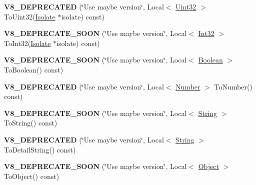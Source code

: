 \begin{DoxyCompactItemize}
\item 
{\bfseries V8\+\_\+\+D\+E\+P\+R\+E\+C\+A\+T\+ED} (\char`\"{}Use maybe version\char`\"{}, Local$<$ \hyperlink{classv8_1_1_uint32}{Uint32} $>$ To\+Uint32(\hyperlink{classv8_1_1_isolate}{Isolate} $\ast$isolate) const)\hypertarget{classv8_1_1_value_a1582d050951071123139095fa6696e6b}{}\label{classv8_1_1_value_a1582d050951071123139095fa6696e6b}

\item 
{\bfseries V8\+\_\+\+D\+E\+P\+R\+E\+C\+A\+T\+E\+\_\+\+S\+O\+ON} (\char`\"{}Use maybe version\char`\"{}, Local$<$ \hyperlink{classv8_1_1_int32}{Int32} $>$ To\+Int32(\hyperlink{classv8_1_1_isolate}{Isolate} $\ast$isolate) const)\hypertarget{classv8_1_1_value_abf72660ee84f81fe2fed85e39e6a3c86}{}\label{classv8_1_1_value_abf72660ee84f81fe2fed85e39e6a3c86}

\item 
{\bfseries V8\+\_\+\+D\+E\+P\+R\+E\+C\+A\+T\+E\+\_\+\+S\+O\+ON} (\char`\"{}Use maybe version\char`\"{}, Local$<$ \hyperlink{classv8_1_1_boolean}{Boolean} $>$ To\+Boolean() const)\hypertarget{classv8_1_1_value_a4c9960d9a42b62b83d70ade47d88fa52}{}\label{classv8_1_1_value_a4c9960d9a42b62b83d70ade47d88fa52}

\item 
{\bfseries V8\+\_\+\+D\+E\+P\+R\+E\+C\+A\+T\+ED} (\char`\"{}Use maybe version\char`\"{}, Local$<$ \hyperlink{classv8_1_1_number}{Number} $>$ To\+Number() const)\hypertarget{classv8_1_1_value_a82d85e91f204bbfcb5299f20158c27c7}{}\label{classv8_1_1_value_a82d85e91f204bbfcb5299f20158c27c7}

\item 
{\bfseries V8\+\_\+\+D\+E\+P\+R\+E\+C\+A\+T\+E\+\_\+\+S\+O\+ON} (\char`\"{}Use maybe version\char`\"{}, Local$<$ \hyperlink{classv8_1_1_string}{String} $>$ To\+String() const)\hypertarget{classv8_1_1_value_a4d1fe1c6d7ba6cccef24fc3fe528d75a}{}\label{classv8_1_1_value_a4d1fe1c6d7ba6cccef24fc3fe528d75a}

\item 
{\bfseries V8\+\_\+\+D\+E\+P\+R\+E\+C\+A\+T\+ED} (\char`\"{}Use maybe version\char`\"{}, Local$<$ \hyperlink{classv8_1_1_string}{String} $>$ To\+Detail\+String() const)\hypertarget{classv8_1_1_value_a963462b3b958c27890253a6e2b35f565}{}\label{classv8_1_1_value_a963462b3b958c27890253a6e2b35f565}

\item 
{\bfseries V8\+\_\+\+D\+E\+P\+R\+E\+C\+A\+T\+E\+\_\+\+S\+O\+ON} (\char`\"{}Use maybe version\char`\"{}, Local$<$ \hyperlink{classv8_1_1_object}{Object} $>$ To\+Object() const)\hypertarget{classv8_1_1_value_a594821f24e204aa6a7b1f003a79089a5}{}\label{classv8_1_1_value_a594821f24e204aa6a7b1f003a79089a5}


\end{DoxyCompactItemize}
